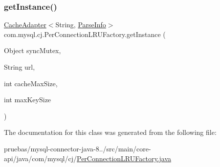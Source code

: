 \subsubsection{\texorpdfstring{get\+Instance()}{getInstance()}}
{\footnotesize\ttfamily \mbox{\hyperlink{interfacecom_1_1mysql_1_1cj_1_1_cache_adapter}{Cache\+Adapter}}$<$String, \mbox{\hyperlink{classcom_1_1mysql_1_1cj_1_1_parse_info}{Parse\+Info}}$>$ com.\+mysql.\+cj.\+Per\+Connection\+L\+R\+U\+Factory.\+get\+Instance (\begin{DoxyParamCaption}\item[{Object}]{sync\+Mutex,  }\item[{String}]{url,  }\item[{int}]{cache\+Max\+Size,  }\item[{int}]{max\+Key\+Size }\end{DoxyParamCaption})}



The documentation for this class was generated from the following file\+:\begin{DoxyCompactItemize}
\item 
pruebas/mysql-\/connector-\/java-\/8../src/main/core-\/api/java/com/mysql/cj/\mbox{\hyperlink{_per_connection_l_r_u_factory_8java}{Per\+Connection\+L\+R\+U\+Factory.\+java}}\end{DoxyCompactItemize}
